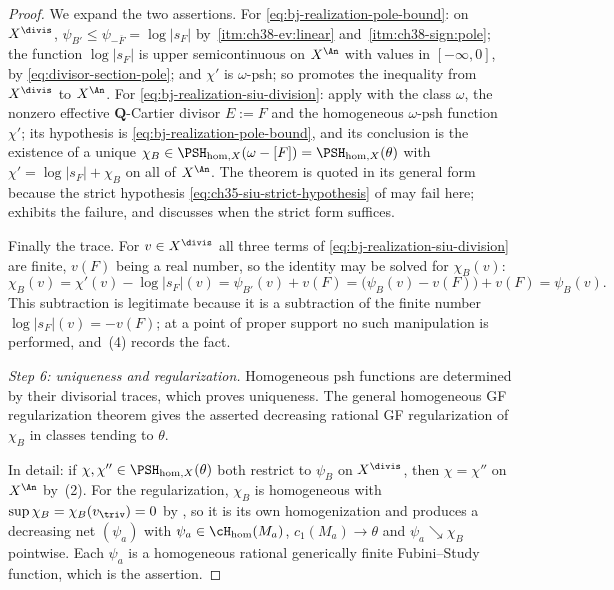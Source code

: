 \begin{proof}
We expand the two assertions.  For \eqref{eq:bj-realization-pole-bound}:
on $X^{\divis}$,
$\psi_{B'}\leq\psi_{-\overline F}=\log|s_F|$ by
\,\cref{itm:ch38-ev:linear} and
\,\cref{itm:ch38-sign:pole}; the function
$\log|s_F|$ is upper semicontinuous on $X^{\An}$ with values in
$[-\infty,0]$, by \eqref{eq:divisor-section-pole}; and $\chi'$ is
$\omega$-psh; so  promotes the
inequality from $X^{\divis}$ to $X^{\An}$.  For
\eqref{eq:bj-realization-siu-division}: apply
 with the class $\omega$, the
nonzero effective $\mathbf Q$-Cartier divisor $E:=F$ and the
homogeneous $\omega$-psh function $\chi'$; its hypothesis is
\eqref{eq:bj-realization-pole-bound}, and its conclusion is the existence
of a unique
$\chi_B\in\PSH_{\mathrm{hom},X}(\omega-[F])=\PSH_{\mathrm{hom},X}(\theta)$
with $\chi'=\log|s_F|+\chi_B$ on all of $X^{\An}$.  The theorem is
quoted in its general form because the strict hypothesis
\eqref{eq:ch35-siu-strict-hypothesis} of
 may fail here;
 exhibits the failure, and
 discusses when the strict form suffices.

Finally the trace.  For $v\in X^{\divis}$ all three terms of
\eqref{eq:bj-realization-siu-division} are finite, $v(F)$ being a real
number, so the identity may be solved for $\chi_B(v)$:
\[
 \chi_B(v)=\chi'(v)-\log|s_F|(v)
 =\psi_{B'}(v)+v(F)
 =\bigl(\psi_B(v)-v(F)\bigr)+v(F)=\psi_B(v).
\]
This subtraction is legitimate because it is a subtraction of the finite
number $\log|s_F|(v)=-v(F)$; at a point of proper support no such
manipulation is performed, and \,(4) records
the fact.

\medskip
\noindent\emph{Step 6: uniqueness and regularization.}
Homogeneous psh functions are determined by their divisorial traces, which
proves uniqueness.  The general homogeneous GF regularization theorem gives
the asserted decreasing rational GF regularization of $\chi_B$ in
classes tending to $\theta$.

In detail: if $\chi,\chi''\in\PSH_{\mathrm{hom},X}(\theta)$ both restrict
to $\psi_B$ on $X^{\divis}$, then $\chi=\chi''$ on $X^{\An}$ by
\,(2).  For the regularization,
$\chi_B$ is homogeneous with $\sup\chi_B=\chi_B(v_{\triv})=0$ by
, so it is its own
homogenization and  produces a
decreasing net $(\psi_a)$ with
$\psi_a\in\cH_{\mathrm{hom}}(M_a)$, $c_1(M_a)\to\theta$ and
$\psi_a\searrow\chi_B$ pointwise.  Each $\psi_a$ is a homogeneous
rational generically finite Fubini--Study function, which is the assertion.
\end{proof}

